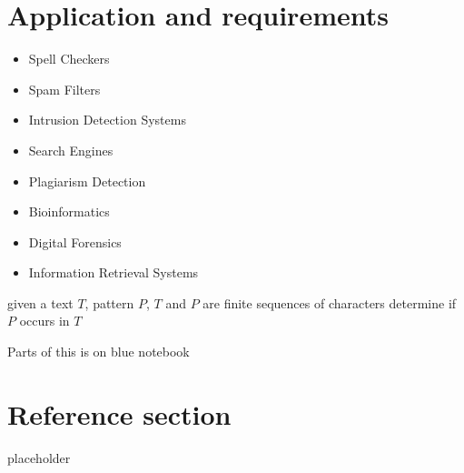 \documentclass{article}
\begin{document}
\section{Application and requirements}
	\begin{itemize}
		\item Spell Checkers
		\item Spam Filters
		\item Intrusion Detection Systems
		\item Search Engines
		\item Plagiarism Detection
		\item Bioinformatics
		\item Digital Forensics
		\item Information Retrieval Systems
	\end{itemize}
	\begin{flushleft}
		given a text $T$, pattern $P$, $T$ and $P$ are finite sequences of characters determine if $P$ occurs in $T$
	\end{flushleft}

	\begin{flushleft}
		Parts of this is on blue notebook
	\end{flushleft}

\pagebreak

\section*{Reference section} \label{sec:reference}
\begin{description}
	\item[placeholder] \hfill \\
\end{description}
\end{document}

